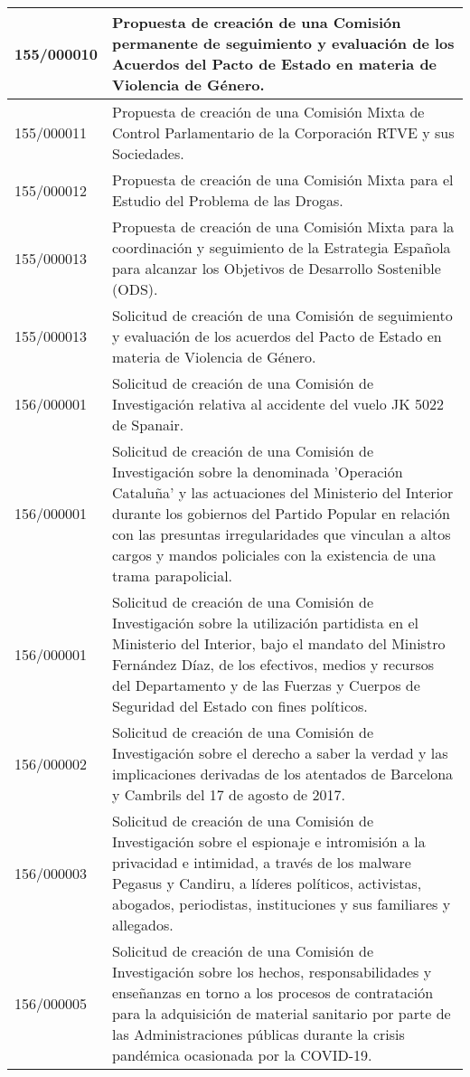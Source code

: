 {\begin{table}[H]
\begin{center}
\begin{tabularx}{\linewidth}{| l | X |}
\hline
155/000010 & Propuesta de creación de una Comisión permanente de seguimiento y evaluación de los Acuerdos del Pacto de Estado en materia de Violencia de Género. \\
\hline
155/000011 & Propuesta de creación de una Comisión Mixta de Control Parlamentario de la Corporación RTVE y sus Sociedades. \\
\hline
155/000012 & Propuesta de creación de una Comisión Mixta para el Estudio del Problema de las Drogas. \\
\hline
155/000013 & Propuesta de creación de una Comisión Mixta para la coordinación y seguimiento de la Estrategia Española para alcanzar los Objetivos de Desarrollo Sostenible (ODS). \\
\hline
155/000013 & Solicitud de creación de una Comisión de seguimiento y evaluación de los acuerdos del Pacto de Estado en materia de Violencia de Género. \\
\hline
156/000001 & Solicitud de creación de una Comisión de Investigación relativa al accidente del vuelo JK 5022 de Spanair. \\
\hline
156/000001 & Solicitud de creación de una Comisión de Investigación sobre la denominada 'Operación Cataluña' y las actuaciones del Ministerio del Interior durante los gobiernos del Partido Popular en relación con las presuntas irregularidades que vinculan a altos cargos y mandos policiales con la existencia de una trama parapolicial. \\
\hline
156/000001 & Solicitud de creación de una Comisión de Investigación sobre la utilización partidista en el Ministerio del Interior, bajo el mandato del Ministro Fernández Díaz, de los efectivos, medios y recursos del Departamento y de las Fuerzas y Cuerpos de Seguridad del Estado con fines políticos. \\
\hline
156/000002 & Solicitud de creación de una Comisión de Investigación sobre el derecho a saber la verdad y las implicaciones derivadas de los atentados de Barcelona y Cambrils del 17 de agosto de 2017. \\
\hline
156/000003 & Solicitud de creación de una Comisión de Investigación sobre el espionaje e intromisión a la privacidad e intimidad, a través de los malware Pegasus y Candiru, a líderes políticos, activistas, abogados, periodistas, instituciones y sus familiares y allegados. \\
\hline
156/000005 & Solicitud de creación de una Comisión de Investigación sobre los hechos, responsabilidades y enseñanzas en torno a los procesos de contratación para la adquisición de material sanitario por parte de las Administraciones públicas durante la crisis pandémica ocasionada por la COVID-19. \\

\end{tabularx}
\end{center}
\end{table}}
